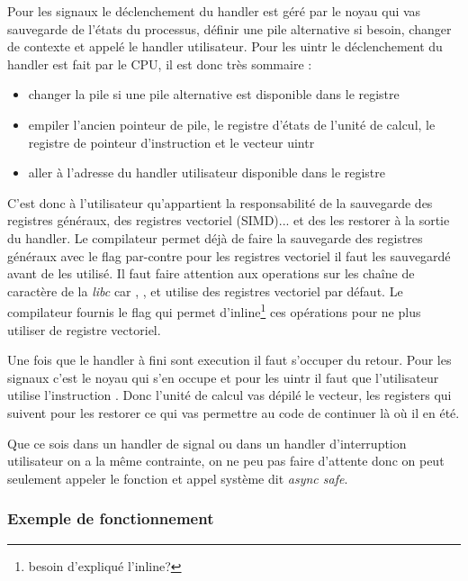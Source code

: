 Pour les signaux le déclenchement du handler est géré par le noyau qui vas sauvegarde de l'états du processus, définir une pile alternative si besoin, changer de contexte et appelé le handler utilisateur.
Pour les uintr le déclenchement du handler est fait par le CPU, il est donc très sommaire :
\begin{itemize}
  \item changer la pile si une pile alternative est disponible dans le registre 
  \item empiler l'ancien pointeur de pile, le registre d'états de l'unité de calcul, le registre de pointeur d'instruction  et le vecteur uintr
  \item aller à l'adresse du handler utilisateur disponible dans le registre\\
\end{itemize}
C'est donc à l'utilisateur qu'appartient la responsabilité de la sauvegarde des registres généraux, des registres vectoriel (SIMD)... et des les restorer à la sortie du handler.
Le compilateur permet déjà de faire la sauvegarde des registres généraux avec le flag  par-contre pour les registres vectoriel il faut les sauvegardé avant de les utilisé.
Il faut faire attention aux operations sur les chaîne de caractère de la \emph{libc} car , ,  et  utilise des registres vectoriel par défaut.
Le compilateur fournis le flag  qui permet d'inline\footnote{besoin d'expliqué l'inline?} ces opérations pour ne plus utiliser de registre vectoriel.

Une fois que le handler à fini sont execution il faut s'occuper du retour. Pour les signaux c'est le noyau qui s'en occupe et pour les uintr il faut que l'utilisateur utilise l'instruction .
Donc l'unité de calcul vas dépilé le vecteur, les registers qui suivent pour les restorer ce qui vas permettre au code de continuer là où il en été.

Que ce sois dans un handler de signal ou dans un handler d'interruption utilisateur on a la même contrainte, on ne peu pas faire d'attente donc on peut seulement appeler le fonction et appel système dit \emph{async safe}.

\subsubsection{Exemple de fonctionnement}
\label{sec:exemple}

